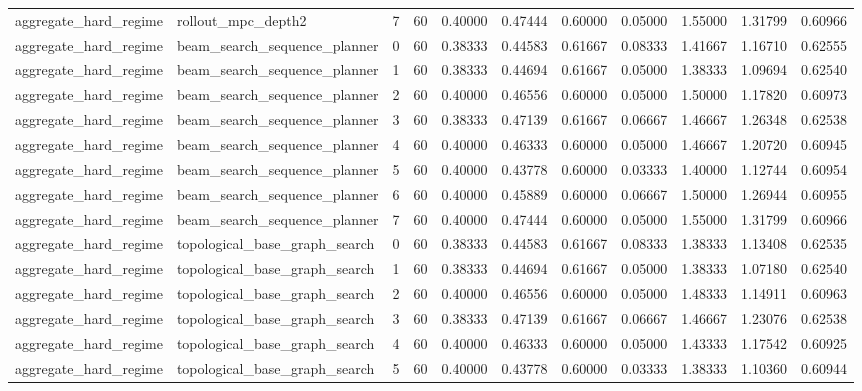 \documentclass{article}
\begin{document}
\begin{table}[tbp]
{\begin{tabular}{lllllllllll}
aggregate\_hard\_regime & rollout\_mpc\_depth2 & 7 & 60 & 0.40000 & 0.47444 & 0.60000 & 0.05000 & 1.55000 & 1.31799 & 0.60966 \\
aggregate\_hard\_regime & beam\_search\_sequence\_planner & 0 & 60 & 0.38333 & 0.44583 & 0.61667 & 0.08333 & 1.41667 & 1.16710 & 0.62555 \\
aggregate\_hard\_regime & beam\_search\_sequence\_planner & 1 & 60 & 0.38333 & 0.44694 & 0.61667 & 0.05000 & 1.38333 & 1.09694 & 0.62540 \\
aggregate\_hard\_regime & beam\_search\_sequence\_planner & 2 & 60 & 0.40000 & 0.46556 & 0.60000 & 0.05000 & 1.50000 & 1.17820 & 0.60973 \\
aggregate\_hard\_regime & beam\_search\_sequence\_planner & 3 & 60 & 0.38333 & 0.47139 & 0.61667 & 0.06667 & 1.46667 & 1.26348 & 0.62538 \\
aggregate\_hard\_regime & beam\_search\_sequence\_planner & 4 & 60 & 0.40000 & 0.46333 & 0.60000 & 0.05000 & 1.46667 & 1.20720 & 0.60945 \\
aggregate\_hard\_regime & beam\_search\_sequence\_planner & 5 & 60 & 0.40000 & 0.43778 & 0.60000 & 0.03333 & 1.40000 & 1.12744 & 0.60954 \\
aggregate\_hard\_regime & beam\_search\_sequence\_planner & 6 & 60 & 0.40000 & 0.45889 & 0.60000 & 0.06667 & 1.50000 & 1.26944 & 0.60955 \\
aggregate\_hard\_regime & beam\_search\_sequence\_planner & 7 & 60 & 0.40000 & 0.47444 & 0.60000 & 0.05000 & 1.55000 & 1.31799 & 0.60966 \\
aggregate\_hard\_regime & topological\_base\_graph\_search & 0 & 60 & 0.38333 & 0.44583 & 0.61667 & 0.08333 & 1.38333 & 1.13408 & 0.62535 \\
aggregate\_hard\_regime & topological\_base\_graph\_search & 1 & 60 & 0.38333 & 0.44694 & 0.61667 & 0.05000 & 1.38333 & 1.07180 & 0.62540 \\
aggregate\_hard\_regime & topological\_base\_graph\_search & 2 & 60 & 0.40000 & 0.46556 & 0.60000 & 0.05000 & 1.48333 & 1.14911 & 0.60963 \\
aggregate\_hard\_regime & topological\_base\_graph\_search & 3 & 60 & 0.38333 & 0.47139 & 0.61667 & 0.06667 & 1.46667 & 1.23076 & 0.62538 \\
aggregate\_hard\_regime & topological\_base\_graph\_search & 4 & 60 & 0.40000 & 0.46333 & 0.60000 & 0.05000 & 1.43333 & 1.17542 & 0.60925 \\
aggregate\_hard\_regime & topological\_base\_graph\_search & 5 & 60 & 0.40000 & 0.43778 & 0.60000 & 0.03333 & 1.38333 & 1.10360 & 0.60944 \\

\end{tabular}}
\end{table}
\end{document}
